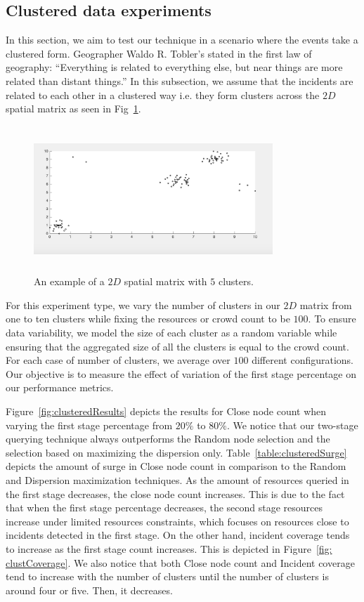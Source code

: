 \documentclass{acm_proc_article-sp}
\begin{document}
\subsection{Clustered data experiments}
In this section, we aim to test our technique in a scenario where the events take a clustered form. Geographer Waldo R. Tobler's stated in the first law of geography: ``Everything is related to everything else, but near things are more related than distant things.'' In this subsection, we assume that the incidents are related to each other in a clustered way i.e. they form clusters across the $2D$ spatial matrix as seen in Fig~\ref{fig: clust}. \par
\begin{figure}[!h]
\centering
\includegraphics[width=9cm ,height=5.5cm]{figuresPng/clust.png}
\caption{An example of a $2D$ spatial matrix with $5$ clusters.}\label{fig: clust}
\end{figure}
For this experiment type, we vary the number of clusters in our $2D$ matrix from one to ten clusters while fixing the resources or crowd count to be $100$. To ensure data variability, we model the size of each cluster as a random variable while ensuring that the aggregated size of all the clusters is equal to the crowd count. For each case of number of clusters, we average over $100$ different configurations. Our objective is to measure the effect of variation of the first stage percentage on our performance metrics.\par
Figure~\ref{fig:clusteredResults} depicts the results for Close node count when varying the first stage percentage from $20\%$ to $80\%$. We notice that our two-stage querying technique always outperforms the Random node selection and the selection based on maximizing the dispersion only. Table~\ref{table:clusteredSurge} depicts the amount of surge in Close node count in comparison to the Random and Dispersion maximization techniques. As the amount of resources queried in the first stage decreases, the close node count increases. This is due to the fact that when the first stage percentage decreases, the second stage resources increase under limited resources constraints, which focuses on resources close to incidents detected in the first stage. On the other hand, incident coverage tends to increase as the first stage count increases. This is depicted in Figure~\ref{fig: clustCoverage}. We also notice that both Close node count and Incident coverage tend to increase with the number of clusters until the number of clusters is around four or five. Then, it decreases.
\end{document}
